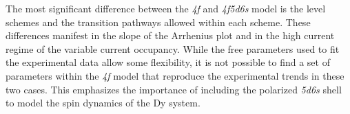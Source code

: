 \documentclass[reprint,amsmath,amssymb,aps,nofootinbib,onecolumn]{revtex4-2}
\begin{document}
The most significant difference between the \textit{4f} and \textit{4f5d6s} model is the level schemes and the transition pathways allowed within each scheme. These differences manifest in the slope of the Arrhenius plot and in the high current regime of the variable current occupancy. While the free parameters used to fit the experimental data allow some flexibility, it is not possible to find a set of parameters within the \textit{4f} model that reproduce the experimental trends in these two cases. This emphasizes the importance of including the polarized \textit{5d6s} shell to model the spin dynamics of the Dy system.    




\end{document}
